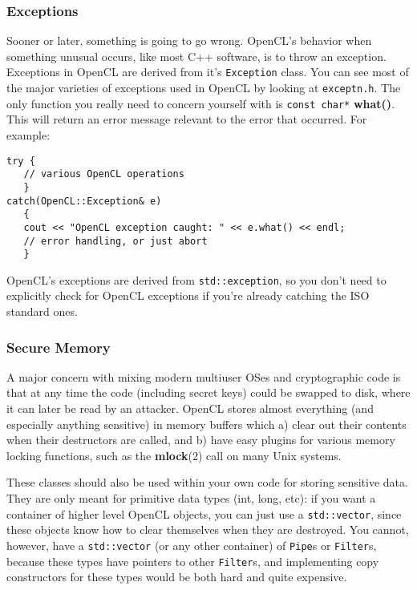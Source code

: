 \documentclass{article}
\newcommand{\filename}[1]{\texttt{#1}}
\newcommand{\function}[1]{\textbf{#1}}
\newcommand{\type}[1]{\texttt{#1}}
\begin{document}
\subsubsection{Exceptions}

Sooner or later, something is going to go wrong. OpenCL's behavior when
something unusual occurs, like most C++ software, is to throw an exception.
Exceptions in OpenCL are derived from it's \type{Exception} class. You can see
most of the major varieties of exceptions used in OpenCL by looking at
\filename{exceptn.h}. The only function you really need to concern yourself
with is \type{const char*} \function{what()}. This will return an error message
relevant to the error that occurred. For example:

\begin{verbatim}
try {
   // various OpenCL operations
   }
catch(OpenCL::Exception& e)
   {
   cout << "OpenCL exception caught: " << e.what() << endl;
   // error handling, or just abort
   }
\end{verbatim}

OpenCL's exceptions are derived from \type{std::exception}, so you don't need
to explicitly check for OpenCL exceptions if you're already catching the
ISO standard ones.

\subsubsection{Secure Memory}

A major concern with mixing modern multiuser OSes and cryptographic code is
that at any time the code (including secret keys) could be swapped to disk,
where it can later be read by an attacker. OpenCL stores almost everything (and
especially anything sensitive) in memory buffers which a) clear out their
contents when their destructors are called, and b) have easy plugins for
various memory locking functions, such as the \function{mlock}(2) call on many
Unix systems.

These classes should also be used within your own code for storing sensitive
data. They are only meant for primitive data types (int, long, etc): if you
want a container of higher level OpenCL objects, you can just use a
\verb|std::vector|, since these objects know how to clear themselves when they
are destroyed. You cannot, however, have a \verb|std::vector| (or any other
container) of \type{Pipe}s or \type{Filter}s, because these types have pointers
to other \type{Filter}s, and implementing copy constructors for these types
would be both hard and quite expensive.
\end{document}
